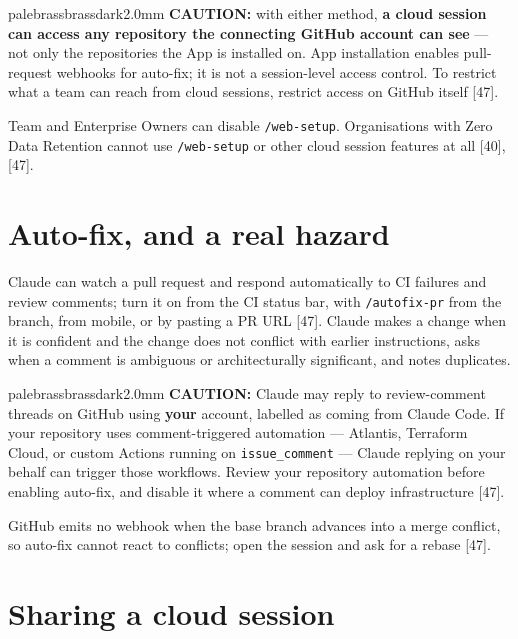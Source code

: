 \documentclass[11pt,a4paper,twoside,openany]{book}
\begin{document}
\begin{calloutbox}{palebrass}{brassdark}{2.0mm}
\textbf{CAUTION:} with either method, \textbf{a cloud session can access any repository the connecting GitHub account can see} — not only the repositories the App is installed on. App installation enables pull-request webhooks for auto-fix; it is not a session-level access control. To restrict what a team can reach from cloud sessions, restrict access on GitHub itself [47].
\end{calloutbox}

Team and Enterprise Owners can disable \texttt{/\allowbreak{}web-\allowbreak{}setup}. Organisations with Zero Data Retention cannot use \texttt{/\allowbreak{}web-\allowbreak{}setup} or other cloud session features at all [40], [47].


\FloatBarrier
\setcounter{section}{3}
\section{Auto-fix, and a real hazard}

Claude can watch a pull request and respond automatically to CI failures and review comments; turn it on from the CI status bar, with \texttt{/\allowbreak{}autofix-\allowbreak{}pr} from the branch, from mobile, or by pasting a PR URL [47]. Claude makes a change when it is confident and the change does not conflict with earlier instructions, asks when a comment is ambiguous or architecturally significant, and notes duplicates.


\begin{calloutbox}{palebrass}{brassdark}{2.0mm}
\textbf{CAUTION:} Claude may reply to review-comment threads on GitHub using \textbf{your} account, labelled as coming from Claude Code. If your repository uses comment-triggered automation — Atlantis, Terraform Cloud, or custom Actions running on \texttt{issue\_\allowbreak{}comment} — Claude replying on your behalf can trigger those workflows. Review your repository automation before enabling auto-fix, and disable it where a comment can deploy infrastructure [47].
\end{calloutbox}

GitHub emits no webhook when the base branch advances into a merge conflict, so auto-fix cannot react to conflicts; open the session and ask for a rebase [47].


\FloatBarrier
\setcounter{section}{4}
\section{Sharing a cloud session}
\end{document}
